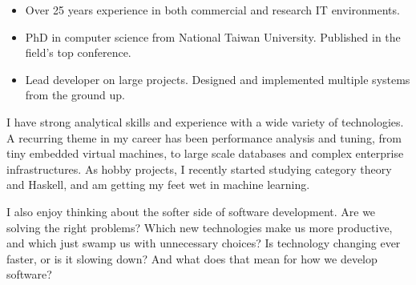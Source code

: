 \documentclass[10pt,a4paper]{../altacv}
\begin{document}
	
	\begin{fullwidth}
		\makecvheader
		
		\begin{itemize}
			\item Over 25 years experience in both commercial and research IT environments.
			\item PhD in computer science from National Taiwan University. Published in the field’s top conference. 
			\item Lead developer on large projects. Designed and implemented multiple systems from the ground up.
		\end{itemize}
		
		\medskip
		
		I have strong analytical skills and experience with a wide variety of technologies. A recurring theme in my career has been performance analysis and tuning, from tiny embedded virtual machines, to large scale databases and complex enterprise infrastructures. As hobby projects, I recently started studying category theory and Haskell, and am getting my feet wet in machine learning.
		
		\medskip
		
		I also enjoy thinking about the softer side of software development. Are we solving the right problems? Which new technologies make us more productive, and which just swamp us with unnecessary choices? Is technology changing ever faster, or is it slowing down? And what does that mean for how we develop software?
		
	\end{fullwidth}
	
	\small
	
	
	
\end{document}
